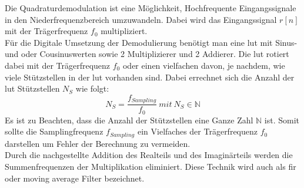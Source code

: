 Die Quadraturdemodulation ist eine Möglichkeit, Hochfrequente Eingangssignale in den Niederfrequenzbereich umzuwandeln. Dabei wird das Eingangssignal \(r[n]\) mit der Trägerfrequenz \(f_0\) multipliziert.\\
Für die Digitale Umsetzung der Demodulierung benötigt man eine \ac{lut} mit Sinus- und oder Cousinuswerten sowie 2 Multiplizierer und 2 Addierer. Die \ac{lut} rotiert dabei mit der Trägerfrequenz $f_0$ oder einen vielfachen davon, je nachdem, wie viele Stützstellen in der \ac{lut} vorhanden sind. Dabei errechnet sich die Anzahl der \ac{lut} Stützstellen $N_S$ wie folgt:
\begin{equation}
N_S=\frac{f_{Sampling}}{f_0}\ mit\ N_S\in\mathbb{N}
\end{equation}
Es ist zu Beachten, dass die Anzahl der Stützstellen eine Ganze Zahl $\mathbb{N}$ ist. Somit sollte die Samplingfrequenz \(f_{Sampling}\) ein Vielfaches der Trägerfrequenz $f_0$ darstellen um Fehler der Berechnung zu vermeiden.\\
Durch die nachgestellte Addition des Realteils und des Imaginärteils werden die Summenfrequenzen der Multiplikation eliminiert. Diese Technik wird auch als \ac{fir} oder moving average Filter bezeichnet.
%
%
%
